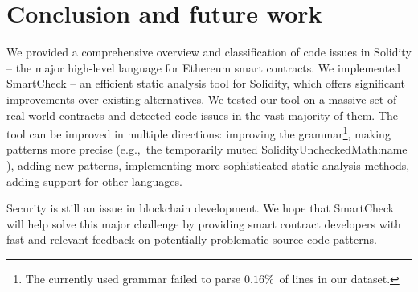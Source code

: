 \section{Conclusion and future work}
	
We provided a comprehensive overview and classification of code issues in Solidity -- the major high-level language for Ethereum smart contracts.
We implemented SmartCheck -- an efficient static analysis tool for Solidity, which offers significant improvements over existing alternatives.
We tested our tool on a massive set of real-world contracts and detected code issues in the vast majority of them.
The tool can be improved in multiple directions: improving the grammar\footnote{The currently used grammar failed to parse $0.16\%$~of lines in our dataset.}, making patterns more precise (e.g.,~the temporarily muted {\usevalue SolidityUncheckedMath:name }), adding new patterns, implementing more sophisticated static analysis methods, adding support for other languages.

Security is still an issue in blockchain development.
We hope that SmartCheck will help solve this major challenge by providing smart contract developers with fast and relevant feedback on potentially problematic source code patterns.